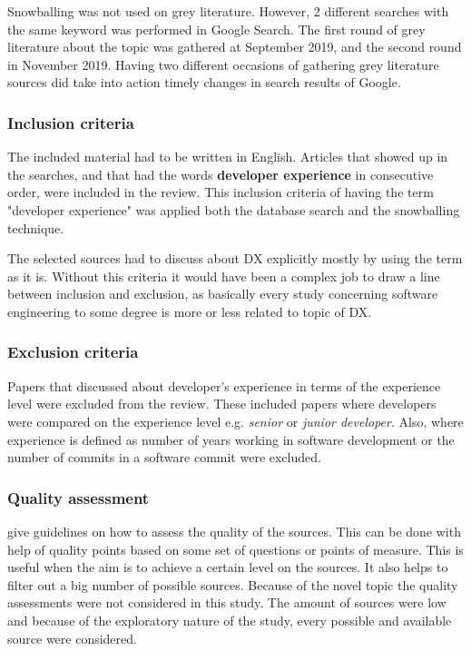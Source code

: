 \documentclass[english, 12pt, a4paper, sci, utf8, a-1b, online]{aaltothesis}
\begin{document}
Snowballing was not used on grey literature. However, 2 different searches with the same keyword was performed in Google Search. The first round of grey literature about the topic was gathered at September 2019, and the second round in November 2019. Having two different occasions of gathering grey literature sources did take into action timely changes in search results of Google.

\subsubsection{Inclusion criteria}

The included material had to be written in English. Articles that showed up in the searches, and that had the words \textbf{developer experience} in consecutive order, were included in the review. This inclusion criteria of having the term "developer experience" was applied both the database search and the snowballing technique.

The selected sources had to discuss about DX explicitly mostly by using the term as it is. Without this criteria it would have been a complex job to draw a line between inclusion and exclusion, as basically every study concerning software engineering to some degree is more or less related to topic of DX.

\subsubsection{Exclusion criteria}

Papers that discussed about developer's experience in terms of the experience level were excluded from the review. These included papers where developers were compared on the experience level e.g. \textit{senior} or \textit{junior developer}. Also, where experience is defined as number of years working in software development or the number of commits in a software commit were excluded.


\subsubsection{Quality assessment}

\textcite{guidelines-for-MLR} give guidelines on how to assess the quality of the sources. This can be done with help of quality points based on some set of questions or points of measure. This is useful when the aim is to achieve a certain level on the sources. It also helps to filter out a big number of possible sources. Because of the novel topic the quality assessments were not considered in this study. The amount of sources were low and because of the exploratory nature of the study, every possible and available source were considered.
\end{document}
